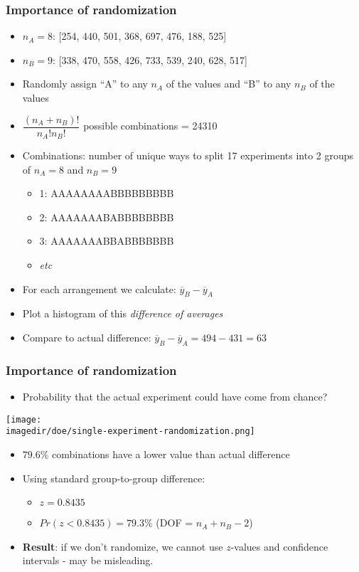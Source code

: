 \begin{frame}\frametitle{Importance of randomization}
	\begin{itemize}
		\item	$n_A = 8$: [254, 440, 501, 368, 697, 476, 188, 525]
		\item	$n_B = 9$: [338, 470, 558, 426, 733, 539, 240, 628, 517]
	\end{itemize}
	\begin{itemize}
		\item	Randomly assign ``A'' to any $n_A$ of the values and ``B'' to any $n_B$ of the values
		\item	$\dfrac{(n_A + n_B)!}{n_A! n_B!}$ possible combinations = 24310
		\item	Combinations: number of unique ways to split 17 experiments into 2 groups of $n_A=8$ and $n_B=9$
		\begin{itemize}
			\item	1: AAAAAAAABBBBBBBBB
			\item	2: AAAAAAABABBBBBBBB
			\item	3: AAAAAAABBABBBBBBB
			\item	\emph{etc}
		\end{itemize}
		\item	For each arrangement we calculate: $\overline{y}_B - \overline{y}_A$
		\item	Plot a histogram of this \emph{difference of averages}
		\item	Compare to actual difference: $\overline{y}_B - \overline{y}_A = 494 - 431 = 63$
	\end{itemize}
\end{frame}

\begin{frame}\frametitle{Importance of randomization}
	\begin{itemize}
		\item	Probability that the actual experiment could have come from chance?
	\end{itemize}
	\begin{center}
		\texttt{[image: \\imagedir/doe/single-experiment-randomization.png]}
	\end{center}
	\begin{itemize}
		\item	$\mathbf{79.6}\%$ combinations have a lower value than actual difference
		\item	Using standard group-to-group difference:
		\begin{itemize}
			\item	$z = 0.8435$
			\item	$Pr(z<0.8435) = \mathbf{79.3}\%$ (DOF = $n_A + n_B - 2$)
		\end{itemize}
	\end{itemize}
	\begin{itemize}
		\item	\textbf{Result}: if we don't randomize, we cannot use $z$-values and confidence intervals - may be misleading.
	\end{itemize}
\end{frame}

